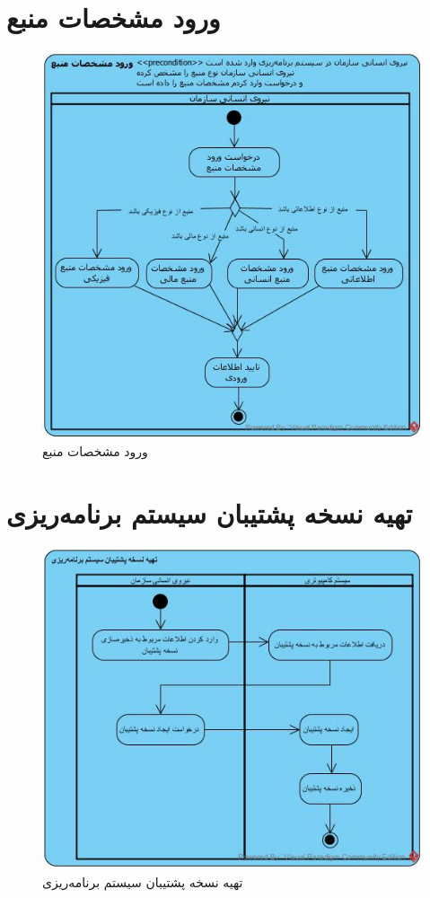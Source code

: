\section{ورود مشخصات منبع}
\begin{figure}[H]
	\centering
	\includegraphics[scale=0.8]{img/activity/EnterResourceAttributes}
	\caption{ورود مشخصات منبع}
\end{figure}

\section{تهیه نسخه پشتیبان سیستم برنامه‌ریزی}
\begin{figure}[H]
	\centering
	\includegraphics[scale=0.8]{img/activity/CreateBackup}
	\caption{تهیه نسخه پشتیبان سیستم برنامه‌ریزی}
\end{figure}


